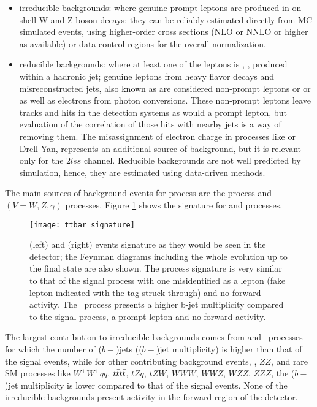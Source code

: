 \begin{itemize}

\item irreducible backgrounds: where genuine prompt leptons are produced in on-shell W and Z boson decays; they can be reliably estimated directly from MC simulated events, using higher-order cross sections (NLO or NNLO or higher as available) or data control regions for the overall normalization.

\item reducible backgrounds: where at least one of the leptons is , \ie, produced within a hadronic jet; genuine leptons from heavy flavor decays and misreconstructed jets, also known as  are considered non-prompt leptons or or  as well as electrons from photon conversions. These non-prompt leptons leave tracks and hits in the detection systems as would a prompt lepton, but evaluation of the correlation of those hits with nearby jets is a way of removing them. The misassignment of electron charge in processes like \ttbar or Drell-Yan, represents an additional source of background, but it is relevant only for the $2lss$ channel. Reducible backgrounds are not well predicted by simulation, hence, they are estimated using data-driven methods. 
\end{itemize}

The main sources of background events for \tHq process are the \ttbar process and \ttV $(V=W,Z,\gamma)$ processes. Figure \ref{fig:ttbar_sign} shows the signature for \ttbar and \ttW processes.     

\begin{figure}[!htb]
\centering
\texttt{[image: ttbar\_signature]}
\caption[\ttbar and \ttW events signature]{\ttbar(left) and \ttW (right) events signature as they would be seen in the detector; the Feynman diagrams including the whole evolution up to the final state are also shown. The \ttbar process signature is very similar to that of the signal process with one \bjet misidentified as a lepton (fake lepton indicated with the \bjet tag struck through) and no forward activity. The \ttW\ process presents a higher b-jet multiplicity compared to the signal process, a prompt lepton and no forward activity.}
\label{fig:ttbar_sign}
\end{figure}

The largest contribution to irreducible backgrounds comes from \ttW and \ttZ\ processes for which the number of ($b-$)jets (($b-$)jet multiplicity) is higher than that of the signal events, while for other contributing background events,  \WZ, $ZZ$, and rare SM processes like $W^\pm W^\pm qq$, $t\bar{t}t\bar{t}$, $tZq$, $tZW$, $WWW$, $WWZ$, $WZZ$, $ZZZ$, the ($b-$)jet multiplicity is lower compared to that of the signal events. None of the irreducible backgrounds present activity in the forward region of the detector.


